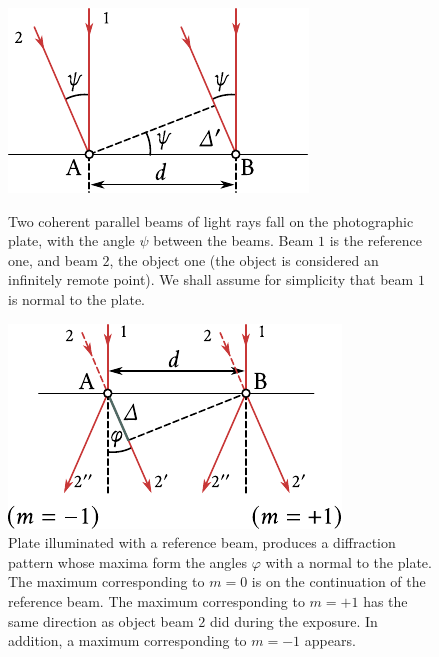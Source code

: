 \begin{figure}[!htb]
	\begin{minipage}[t]{0.48\linewidth}
		\begin{center}
			\includegraphics[scale=1]{figures/ch_18/fig_18_50.pdf}
	        \caption[]{Two coherent parallel beams of light rays fall on the photographic plate, with the angle $\psi$ between the beams. Beam $1$ is the reference one, and beam $2$, the object one (the object is considered an infinitely remote point). We shall assume for simplicity that beam $1$ is normal to the plate.}
			\label{fig:18_50}
		\end{center}
	\end{minipage}
	\hfill{ }%
	\begin{minipage}[t]{0.48\linewidth}
		\begin{center}
			\includegraphics[scale=1]{figures/ch_18/fig_18_51.pdf}
	        \caption[]{Plate illuminated with a reference beam, produces a diffraction pattern whose maxima form the angles $\varphi$ with a normal to the plate. The maximum corresponding to $m=0$ is on the continuation of the reference beam. The maximum corresponding to $m=+1$ has the same direction as object beam $2$ did during the exposure. In addition, a maximum corresponding to $m=-1$ appears.}
			\label{fig:18_51}
		\end{center}
	\end{minipage}
\vspace{-0.4cm}
\end{figure}

